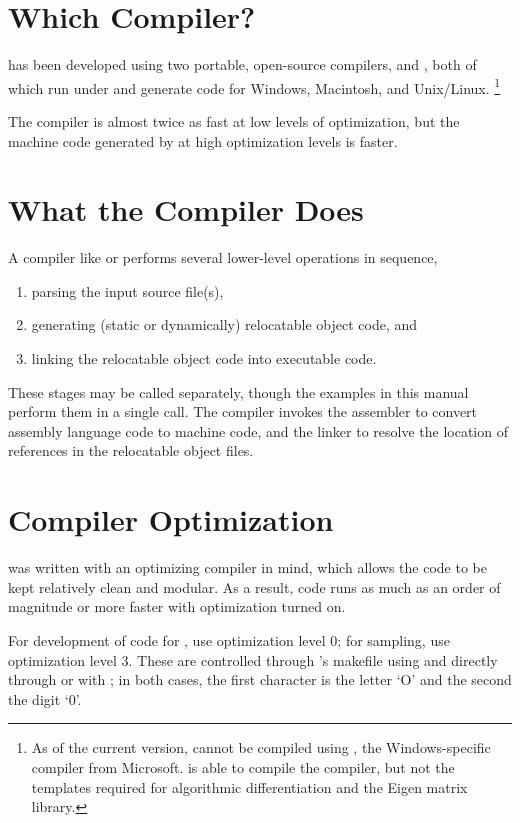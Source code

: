 \section{Which Compiler?}

\Stan has been developed using two portable, open-source \Cpp
compilers, \gpp and \clang, both of which run under and generate code
for Windows, Macintosh, and Unix/Linux.%
%
\footnote{As of the current version, \Stan cannot be compiled using
  \MSVC, the Windows-specific compiler from Microsoft.  \MSVC is able
  to compile the  compiler, but not the templates required
  for algorithmic differentiation and the Eigen matrix library.}

The \clang compiler is almost twice as fast at low levels of
optimization, but the machine code generated by \gpp at high
optimization levels is faster.


\section{What the Compiler Does}

A \Cpp compiler like \gpp or \clang performs several lower-level
operations in sequence,
% 
\begin{enumerate}
\item
parsing the input \Cpp source file(s), 
\item 
generating (static or dynamically) relocatable object code, and
\item 
linking the relocatable object code into executable code.
\end{enumerate}
%
These stages may be called separately, though the examples in this
manual perform them in a single call.  The compiler invokes the
assembler to convert assembly language code to machine code, and the
linker to resolve the location of references in the relocatable object
files.

\section{Compiler Optimization}

\Stan was written with an optimizing compiler in mind, which allows
the code to be kept relatively clean and modular.  As a result, \Stan
code runs as much as an order of magnitude or more faster with
optimization turned on.

For development of \Cpp code for \Stan, use optimization level 0; for
sampling, use optimization level 3.  These are controlled through
\Stan's makefile using  and directly through \clang or \gpp
with ; in both cases, the first character is the letter `O'
and the second the digit `0'.


